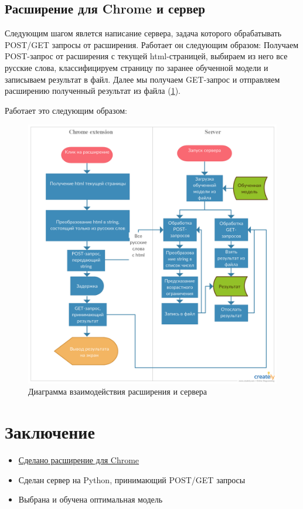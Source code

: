 \documentclass[14pt]{matmex-diploma}
\begin{document}
    
    \subsection{Расширение для Chrome и сервер}
    
        Следующим шагом явлется написание сервера, задача которого обрабатывать POST/GET запросы от расширения. Работает он следующим образом:
        Получаем POST-запрос от расширения с текущей html-страницей, выбираем из него все русские слова, классифицируем страницу по заранее обученной
        модели и записываем результат в файл. Далее мы получаем GET-запрос и отправляем расширению полученный результат из файла (\ref{uml}).
    
        Работает это следующим образом:
        \begin{figure}[h]
            \centering
        	\includegraphics[scale=0.22]{images/uml.png}
        	\caption{Диаграмма взаимодействия расширения и сервера}
        	\label{uml}
        \end{figure}     
        
\section*{Заключение}        
    \begin{Large}
            \begin{itemize}
                \item \href{https://github.com/SmirnovAlexander/PoemClassifier}{Сделано расширение для Chrome}
                \item Сделан сервер на Python, принимающий POST/GET запросы
                \item Выбрана и обучена оптимальная модель 
            \end{itemize}
    \end{Large}

\setmonofont[Mapping=tex-text]{CMU Typewriter Text}


\end{document}
